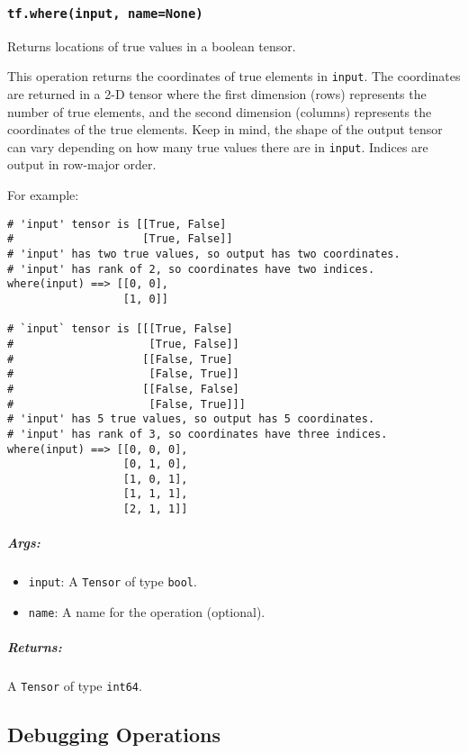 \subsubsection{\texorpdfstring{\texttt{tf.where(input,\ name=None)}
}{tf.where(input, name=None) }}\label{tf.whereinput-namenone}

Returns locations of true values in a boolean tensor.

This operation returns the coordinates of true elements in
\texttt{input}. The coordinates are returned in a 2-D tensor where the
first dimension (rows) represents the number of true elements, and the
second dimension (columns) represents the coordinates of the true
elements. Keep in mind, the shape of the output tensor can vary
depending on how many true values there are in \texttt{input}. Indices
are output in row-major order.

For example:

\begin{verbatim}
# 'input' tensor is [[True, False]
#                    [True, False]]
# 'input' has two true values, so output has two coordinates.
# 'input' has rank of 2, so coordinates have two indices.
where(input) ==> [[0, 0],
                  [1, 0]]

# `input` tensor is [[[True, False]
#                     [True, False]]
#                    [[False, True]
#                     [False, True]]
#                    [[False, False]
#                     [False, True]]]
# 'input' has 5 true values, so output has 5 coordinates.
# 'input' has rank of 3, so coordinates have three indices.
where(input) ==> [[0, 0, 0],
                  [0, 1, 0],
                  [1, 0, 1],
                  [1, 1, 1],
                  [2, 1, 1]]
\end{verbatim}

\subparagraph{Args: }\label{args-15}

\begin{itemize}
\tightlist
\item
  \texttt{input}: A \texttt{Tensor} of type \texttt{bool}.
\item
  \texttt{name}: A name for the operation (optional).
\end{itemize}

\subparagraph{Returns: }\label{returns-15}

A \texttt{Tensor} of type \texttt{int64}.

\subsection{Debugging Operations }\label{debugging-operations}

